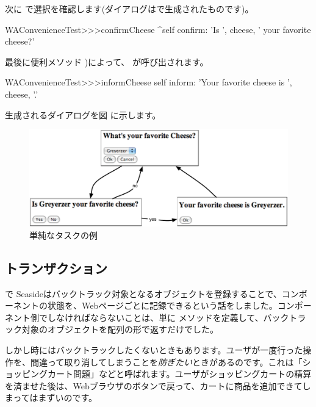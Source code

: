 \documentclass[a4paper,10pt,twoside]{book}
\begin{document}

次に  で選択を確認します(ダイアログはで生成されたものです)。

\begin{code}{}
WAConvenienceTest>>>confirmCheese
	^self confirm: 'Is ', cheese,  ' your favorite cheese?'
\end{code}

最後に便利メソッド )によって、 が呼び出されます。

\begin{code}{}
WAConvenienceTest>>>informCheese
	self inform: 'Your favorite cheese is ', cheese, '.'
\end{code}

生成されるダイアログを図 に示します。

\begin{figure}[ht]
\begin{center}
\includegraphics[width=\textwidth]{chooseCheese}
\caption{単純なタスクの例}
\end{center}
\end{figure}

\subsection{トランザクション}

  で Seasideはバックトラック対象となるオブジェクトを登録することで、コンポーネントの状態を、Webページごとに記録できるという話をしました。コンポーネント側でしなければならないことは、単に  メソッドを定義して、バックトラック対象のオブジェクトを配列の形で返すだけでした。

しかし時にはバックトラックしたくないときもあります。ユーザが一度行った操作を、間違って取り消してしまうことを\emph{防ぎたい}ときがあるのです。これは「ショッピングカート問題」などと呼ばれます。ユーザがショッピングカートの精算を済ませた後は、Webブラウザのボタンで戻って、カートに商品を追加できてしまってはまずいのです。
\end{document}
